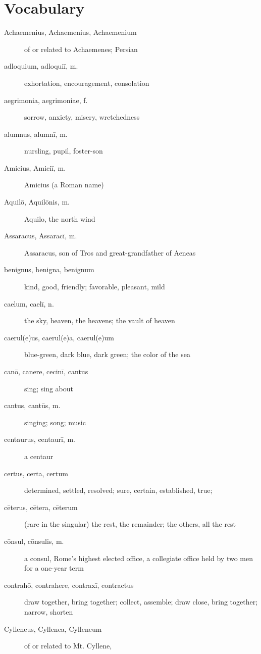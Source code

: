 \chapter*{Vocabulary}

\begin{description}
    \item[Achaemenius, Achaemenius, Achaemenium] of or related to Achaemenes;
        Persian
    \item[adloquium, adloquiī, m.] exhortation, encouragement, consolation
    \item[aegrimonia, aegrimoniae, f.] sorrow, anxiety, misery, wretchedness
    \item[alumnus, alumnī, m.] nursling, pupil, foster-son
    \item[Amicius, Amiciī, m.] Amicius (a Roman name)
    \item[Aquilō, Aquilōnis, m.] Aquilo, the north wind
    \item[Assaracus, Assaracī, m.] Assaracus, son of Tros and great-grandfather
        of Aeneas
    \item[benignus, benigna, benignum] kind, good, friendly; favorable,
        pleasant, mild
    \item[caelum, caelī, n.] the sky, heaven, the heavens; the vault of heaven
    \item[caerul(e)us, caerul(e)a, caerul(e)um] blue-green, dark blue, dark
        green; the color of the sea
    \item[canō, canere, cecinī, cantus] sing; sing about
    \item[cantus, cantūs, m.] singing; song; music
    \item[centaurus, centaurī, m.] a centaur
    \item[certus, certa, certum] determined, settled, resolved; sure, certain,
        established, true;
    \item[cēterus, cētera, cēterum] (rare in the singular) the rest, the
        remainder; the others, all the rest
    \item[cōnsul, cōnsulis, m.] a consul, Rome's highest elected office,
        a collegiate office held by two men for a one-year term
    \item[contrahō, contrahere, contraxī, contractus] draw together, bring
        together; collect, assemble; draw close, bring together; narrow,
        shorten
    \item[Cylleneus, Cyllenea, Cylleneum] of or related to Mt. Cyllene,

\end{description}
